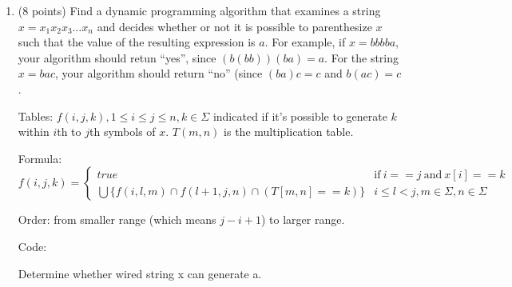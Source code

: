 \documentclass[paper=a4, fontsize=11pt]{scrartcl} %
\begin{document}
\begin{enumerate}
\item
  \begin{fancyquotes}
    (8 points) Find a dynamic programming algorithm that examines a
    string $x = x_1x_2x_3\ldots x_n$ and decides whether or not it is
    possible to parenthesize $x$ such that the value of the resulting
    expression is $a$. For example, if $x = bbbba$, your algorithm
    should retun ``yes'', since $(b(bb))(ba) = a$. For the string $x =
    bac$, your algorithm should return ``no'' (since $(ba)c = c$ and
    $b(ac) = c$.
  \end{fancyquotes}

  Tables:
  $f(i,j,k), 1\leq i\leq j\leq n, k\in \Sigma$ indicated if it's
  possible to generate $k$ within $i$th to $j$th symbols of $x$.
  $T(m,n)$ is the multiplication table.

  Formula:
  \begin{equation*}
    f(i,j,k)=
    \begin{cases}
      true & \text{if}\ i==j\ \text{and}\ x[i]==k\\
      \bigcup\{f(i,l,m) \cap f(l+1,j,n) \cap (T[m, n] == k)\} &
      i\leq l<j, m\in\Sigma ,n\in\Sigma
    \end{cases}
  \end{equation*}

  Order: from smaller range (which means $j-i+1$) to larger range.

  Code:

  \begin{algorithm}[H]
    \caption{Determine whether wired string x can generate a.}
  \end{algorithm}



\end{enumerate}
\end{document}
